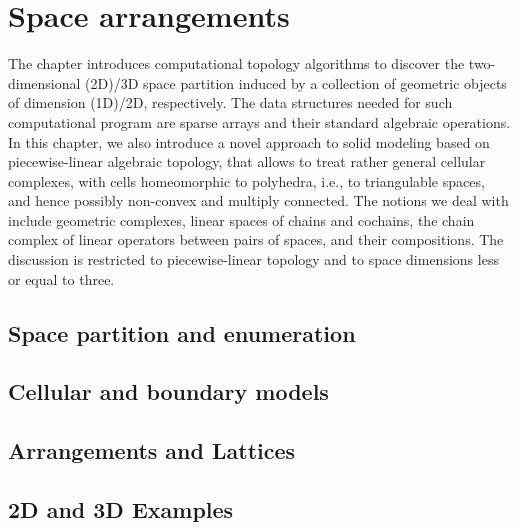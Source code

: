
\chapter{Space arrangements}
\label{chapt:7}

The chapter introduces computational topology algorithms to discover the two-dimensional (2D)/3D space partition induced by a collection of geometric objects of dimension (1D)/2D, respectively. 
The data structures needed for such computational program are sparse arrays and their standard algebraic operations. In this chapter, we also introduce a novel approach to solid modeling based on piecewise-linear algebraic topology, that allows to treat rather general cellular complexes, with cells homeomorphic to polyhedra, i.e., to triangulable spaces, and hence possibly non-convex and multiply connected. The notions we deal with include geometric complexes, linear spaces of chains and cochains, the chain complex of linear operators between pairs of spaces, and their compositions. The discussion is restricted to piecewise-linear topology and to space dimensions less or equal to three. 

\section{ Space partition and enumeration}\label{sect:7-1}


\section{ Cellular and boundary models}\label{sect:7-2}


\section{ Arrangements and Lattices}\label{sect:7-3}


\section{ 2D and 3D Examples}\label{sect:7-4}


